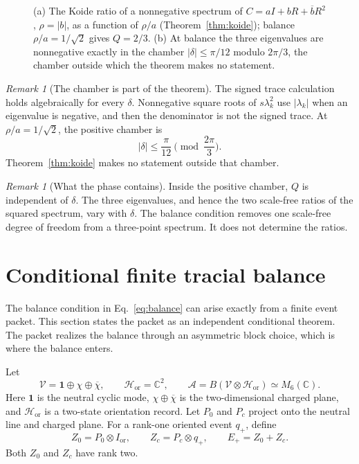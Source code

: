 \documentclass[11pt]{article}
\theoremstyle{remark}
\newtheorem{remark}[theorem]{Remark}
\newcommand{\C}{\mathbb C}
\newcommand{\one}{\mathbf 1}
\begin{document}
\begin{figure}[!htb]
\centering

\caption{(a) The Koide ratio of a nonnegative spectrum of $C=aI+bR+\overline bR^2$, $\rho=|b|$, as a function of $\rho/a$ (Theorem~\ref{thm:koide}); balance $\rho/a=1/\sqrt2$ gives $Q=2/3$. (b) At balance the three eigenvalues are nonnegative exactly in the chamber $|\delta|\le\pi/12$ modulo $2\pi/3$, the chamber outside which the theorem makes no statement.}
\label{fig:koide}
\end{figure}
\begin{remark}[The chamber is part of the theorem]
The signed trace calculation holds algebraically for every \(\delta\).
Nonnegative square roots of \(s\lambda_k^2\) use \(|\lambda_k|\) when an
eigenvalue is negative, and then the denominator is not the signed trace. At
\(\rho/a=1/\sqrt2\), the positive chamber is
\[
|\delta|\leq\frac{\pi}{12}\pmod{\frac{2\pi}{3}}.
\]
Theorem~\ref{thm:koide} makes no statement outside that chamber.
\end{remark}

\begin{remark}[What the phase contains]
Inside the positive chamber, \(Q\) is independent of \(\delta\). The three
eigenvalues, and hence the two scale-free ratios of the squared spectrum,
vary with \(\delta\). The balance condition removes one scale-free degree of
freedom from a three-point spectrum. It does not determine the ratios.
\end{remark}

\section{Conditional finite tracial balance}

The balance condition in Eq.~\eqref{eq:balance} can arise exactly from a
finite event packet. This section states the packet as an independent
conditional theorem. The packet realizes the balance through an asymmetric
block choice, which is where the balance enters.

Let
\[
\mathcal V=\one\oplus\chi\oplus\overline\chi,
\qquad
\mathcal H_{\mathrm{or}}=\C^2,
\qquad
\mathcal A=B(\mathcal V\otimes\mathcal H_{\mathrm{or}})
\simeq M_6(\C).
\]
Here \(\one\) is the neutral cyclic mode, \(\chi\oplus\overline\chi\) is the
two-dimensional charged plane, and \(\mathcal H_{\mathrm{or}}\) is a
two-state orientation record. Let \(P_0\) and \(P_c\) project onto the neutral
line and charged plane. For a rank-one oriented event \(q_+\), define
\[
Z_0=P_0\otimes I_{\mathrm{or}},
\qquad
Z_c=P_c\otimes q_+,
\qquad
E_+=Z_0+Z_c.
\]
Both \(Z_0\) and \(Z_c\) have rank two.
\end{document}
